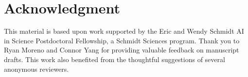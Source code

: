 \section*{Acknowledgment}

This material is based upon work supported by the Eric and Wendy Schmidt AI in Science Postdoctoral Fellowship, a Schmidt Sciences program.
Thank you to Ryan Moreno and Connor Yang for providing valuable feedback on manuscript drafts.
This work also benefited from the thoughtful suggestions of several anonymous reviewers.
